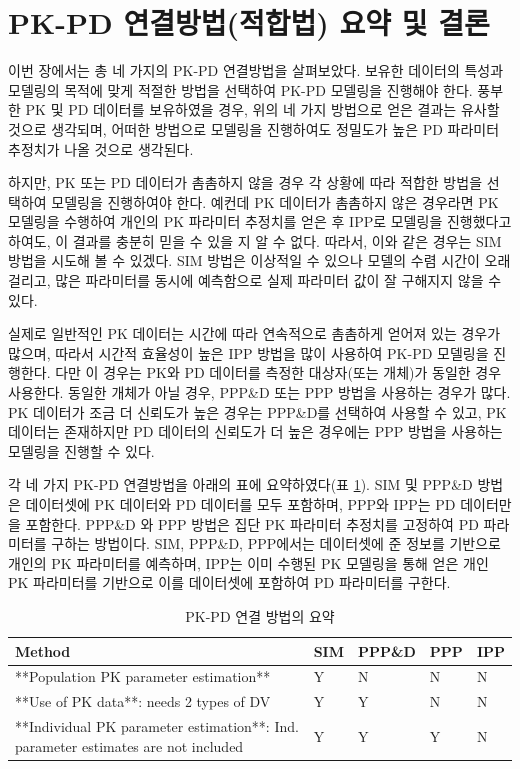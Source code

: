 \documentclass[
  10pt,
  krantz2,
  a4paper]{krantz}
\theoremstyle{definition}
\theoremstyle{definition}
\theoremstyle{definition}
\theoremstyle{remark}
\begin{document}
\hypertarget{pk-pd-uxc5f0uxacb0uxbc29uxbc95uxc801uxd569uxbc95-uxc694uxc57d-uxbc0f-uxacb0uxb860}{%
\section{PK-PD 연결방법(적합법) 요약 및 결론}\label{pk-pd-uxc5f0uxacb0uxbc29uxbc95uxc801uxd569uxbc95-uxc694uxc57d-uxbc0f-uxacb0uxb860}}

이번 장에서는 총 네 가지의 PK-PD 연결방법을 살펴보았다. 보유한 데이터의 특성과 모델링의 목적에 맞게 적절한 방법을 선택하여 PK-PD 모델링을 진행해야 한다. 풍부한 PK 및 PD 데이터를 보유하였을 경우, 위의 네 가지 방법으로 얻은 결과는 유사할 것으로 생각되며, 어떠한 방법으로 모델링을 진행하여도 정밀도가 높은 PD 파라미터 추정치가 나올 것으로 생각된다.

하지만, PK 또는 PD 데이터가 촘촘하지 않을 경우 각 상황에 따라 적합한 방법을 선택하여 모델링을 진행하여야 한다. 예컨데 PK 데이터가 촘촘하지 않은 경우라면 PK 모델링을 수행하여 개인의 PK 파라미터 추정치를 얻은 후 IPP로 모델링을 진행했다고 하여도, 이 결과를 충분히 믿을 수 있을 지 알 수 없다. 따라서, 이와 같은 경우는 SIM 방법을 시도해 볼 수 있겠다. SIM 방법은 이상적일 수 있으나 모델의 수렴 시간이 오래 걸리고, 많은 파라미터를 동시에 예측함으로 실제 파라미터 값이 잘 구해지지 않을 수 있다.

실제로 일반적인 PK 데이터는 시간에 따라 연속적으로 촘촘하게 얻어져 있는 경우가 많으며, 따라서 시간적 효율성이 높은 IPP 방법을 많이 사용하여 PK-PD 모델링을 진행한다. 다만 이 경우는 PK와 PD 데이터를 측정한 대상자(또는 개체)가 동일한 경우 사용한다. 동일한 개체가 아닐 경우, PPP\&D 또는 PPP 방법을 사용하는 경우가 많다. PK 데이터가 조금 더 신뢰도가 높은 경우는 PPP\&D를 선택하여 사용할 수 있고, PK 데이터는 존재하지만 PD 데이터의 신뢰도가 더 높은 경우에는 PPP 방법을 사용하는 모델링을 진행할 수 있다.

각 네 가지 PK-PD 연결방법을 아래의 표에 요약하였다(표 \ref{tab:pkpd-link-summary}). SIM 및 PPP\&D 방법은 데이터셋에 PK 데이터와 PD 데이터를 모두 포함하며, PPP와 IPP는 PD 데이터만을 포함한다. PPP\&D 와 PPP 방법은 집단 PK 파라미터 추정치를 고정하여 PD 파라미터를 구하는 방법이다. SIM, PPP\&D, PPP에서는 데이터셋에 준 정보를 기반으로 개인의 PK 파라미터를 예측하며, IPP는 이미 수행된 PK 모델링을 통해 얻은 개인 PK 파라미터를 기반으로 이를 데이터셋에 포함하여 PD 파라미터를 구한다.

\begin{table}

\caption{\label{tab:pkpd-link-summary}PK-PD 연결 방법의 요약}
\centering
\begin{tabular}[t]{lllll}
\toprule
Method & SIM & PPP\&D & PPP & IPP\\
\midrule
**Population PK parameter estimation** & Y & N & N & N\\
**Use of PK data**: needs 2 types of DV & Y & Y & N & N\\
**Individual PK parameter estimation**: Ind. parameter estimates are not included & Y & Y & Y & N\\
\bottomrule
\end{tabular}
\end{table}
\end{document}
